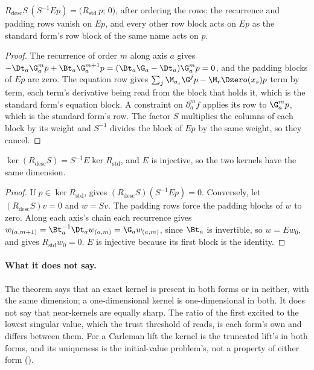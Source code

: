 \begin{proposition}
\label{prop:substitution-identity}
$R_{\mathrm{desc}}S\,(S^{-1}Ep)=\bigl(R_{\mathrm{std}}\,p;\,0\bigr)$, after ordering the rows: the recurrence and padding rows vanish on $Ep$, and every other row block acts on $Ep$ as the standard form's row block of the same name acts on $p$.
\end{proposition}
\begin{proof}
The recurrence of order $m$ along axis $a$ gives $-\Dt_a\G_a^mp+\Bt_a\G_a^{m+1}p=(\Bt_a\G_a-\Dt_a)\G_a^mp=0$, and the padding blocks of $Ep$ are zero. The equation row gives $\sum_j\M_{a_j}\G^jp-\M_r\Dzero(x_s)p$ term by term, each term's derivative being read from the block that holds it, which is the standard form's equation block. A constraint on $\partial_a^mf$ applies its row to $\G_a^mp$, which is the standard form's row. The factor $S$ multiplies the columns of each block by its weight and $S^{-1}$ divides the block of $Ep$ by the same weight, so they cancel.
\end{proof}

\begin{theorem}
\label{thm:kernel-equivalence-general}
$\ker(R_{\mathrm{desc}}S)=S^{-1}E\ker R_{\mathrm{std}}$, and $E$ is injective, so the two kernels have the same dimension.
\end{theorem}
\begin{proof}
If $p\in\ker R_{\mathrm{std}}$,  gives $(R_{\mathrm{desc}}S)(S^{-1}Ep)=0$. Conversely, let $(R_{\mathrm{desc}}S)v=0$ and $w=Sv$. The padding rows force the padding blocks of $w$ to zero. Along each axis's chain each recurrence gives $w_{(a,m+1)}=\Bt_a^{-1}\Dt_aw_{(a,m)}=\G_aw_{(a,m)}$, since $\Bt_a$ is invertible, so $w=Ew_0$, and  gives $R_{\mathrm{std}}w_0=0$. $E$ is injective because its first block is the identity.
\end{proof}

\paragraph{What it does not say.} The theorem says that an exact kernel is present in both forms or in neither, with the same dimension; a one-dimensional kernel is one-dimensional in both. It does not say that near-kernels are equally sharp. The ratio of the first excited to the lowest singular value, which the trust threshold of  reads, is each form's own and differs between them. For a Carleman lift the kernel is the truncated lift's in both forms, and its uniqueness is the initial-value problem's, not a property of either form ().

